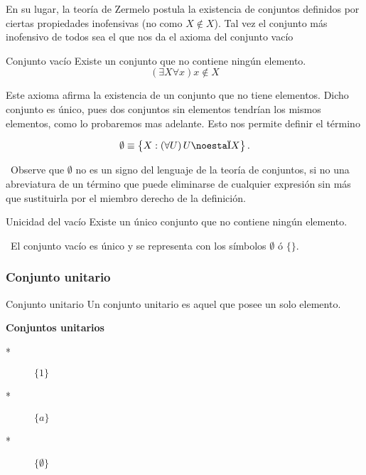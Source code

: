 En su lugar, la teoría de Zermelo postula la existencia de conjuntos
definidos por ciertas propiedades inofensivas (no como $X\notin X$).
Tal vez el conjunto más inofensivo de todos sea el que nos da el axioma
del conjunto vacío 

\vspace*{20pt}\begin{axioma}{ Conjunto vacío}{} Existe un conjunto
que no contiene ningún elemento.
\[
\left(\exists X\forall x\right)x\notin X
\]

\end{axioma}

Este axioma afirma la existencia de un conjunto que no tiene elementos.
Dicho conjunto es único, pues dos conjuntos sin elementos tendrían
los mismos elementos, como lo probaremos mas adelante. Esto nos permite
definir el término

\[
\textrm{\ensuremath{\emptyset}}\equiv\left\{ X:\left(\forall U\right)U\notin X\right\} .
\]

\obs\ Observe que $\emptyset$ no es un signo del lenguaje de la
teoría de conjuntos, si no una abreviatura de un término que puede
eliminarse de cualquier expresión sin más que sustituirla por el miembro
derecho de la definición. 

\begin{lema}{ Unicidad del vacío}{} Existe un único conjunto que
no contiene ningún elemento.\end{lema} 

\notacion\ El conjunto vacío es único y se representa con los símbolos
$\emptyset$ ó $\{\}.$

\subsubsection{Conjunto unitario}

\begin{defi}{ Conjunto unitario}{} Un conjunto unitario es aquel
que posee un solo elemento.\end{defi}

\begin{ejemplo}{\bf Conjuntos unitarios} 
\begin{description}
\item [{{*}}] $\{1\}$
\item [{{*}}] $\{a\}$
\item [{{*}}] $\{\emptyset\}$
\end{description}
\end{ejemplo}

